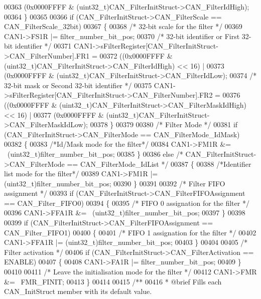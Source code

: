 \begin{DoxyCode}
00363         (0x0000FFFF & (uint32\_t)CAN\_FilterInitStruct->CAN\_FilterIdHigh);
00364   \}
00365 
00366   \textcolor{keywordflow}{if} (CAN\_FilterInitStruct->CAN_FilterScale == CAN_FilterScale_32bit)
00367   \{
00368     \textcolor{comment}{/* 32-bit scale for the filter */}
00369     CAN1->FS1R |= filter\_number\_bit\_pos;
00370     \textcolor{comment}{/* 32-bit identifier or First 32-bit identifier */}
00371     CAN1->sFilterRegister[CAN\_FilterInitStruct->CAN\_FilterNumber].FR1 =
00372        ((0x0000FFFF & (uint32\_t)CAN\_FilterInitStruct->CAN\_FilterIdHigh) << 16) |
00373         (0x0000FFFF & (uint32\_t)CAN\_FilterInitStruct->CAN\_FilterIdLow);
00374     \textcolor{comment}{/* 32-bit mask or Second 32-bit identifier */}
00375     CAN1->sFilterRegister[CAN\_FilterInitStruct->CAN\_FilterNumber].FR2 =
00376        ((0x0000FFFF & (uint32\_t)CAN\_FilterInitStruct->CAN\_FilterMaskIdHigh) << 16) |
00377         (0x0000FFFF & (uint32\_t)CAN\_FilterInitStruct->CAN\_FilterMaskIdLow);
00378   \}
00379 
00380   \textcolor{comment}{/* Filter Mode */}
00381   \textcolor{keywordflow}{if} (CAN\_FilterInitStruct->CAN_FilterMode == CAN_FilterMode_IdMask)
00382   \{
00383     \textcolor{comment}{/*Id/Mask mode for the filter*/}
00384     CAN1->FM1R &= ~(uint32\_t)filter\_number\_bit\_pos;
00385   \}
00386   \textcolor{keywordflow}{else} \textcolor{comment}{/* CAN\_FilterInitStruct->CAN\_FilterMode == CAN\_FilterMode\_IdList */}
00387   \{
00388     \textcolor{comment}{/*Identifier list mode for the filter*/}
00389     CAN1->FM1R |= (uint32\_t)filter\_number\_bit\_pos;
00390   \}
00391 
00392   \textcolor{comment}{/* Filter FIFO assignment */}
00393   \textcolor{keywordflow}{if} (CAN\_FilterInitStruct->CAN_FilterFIFOAssignment == CAN_Filter_FIFO0)
00394   \{
00395     \textcolor{comment}{/* FIFO 0 assignation for the filter */}
00396     CAN1->FFA1R &= ~(uint32\_t)filter\_number\_bit\_pos;
00397   \}
00398 
00399   \textcolor{keywordflow}{if} (CAN\_FilterInitStruct->CAN_FilterFIFOAssignment == CAN_Filter_FIFO1)
00400   \{
00401     \textcolor{comment}{/* FIFO 1 assignation for the filter */}
00402     CAN1->FFA1R |= (uint32\_t)filter\_number\_bit\_pos;
00403   \}
00404 
00405   \textcolor{comment}{/* Filter activation */}
00406   \textcolor{keywordflow}{if} (CAN\_FilterInitStruct->CAN_FilterActivation == ENABLE)
00407   \{
00408     CAN1->FA1R |= filter\_number\_bit\_pos;
00409   \}
00410 
00411   \textcolor{comment}{/* Leave the initialisation mode for the filter */}
00412   CAN1->FMR &= ~FMR_FINIT;
00413 \}
00414 
00415 \textcolor{comment}{/**}
00416 \textcolor{comment}{  * @brief  Fills each CAN\_InitStruct member with its default value.}

\end{DoxyCode}
